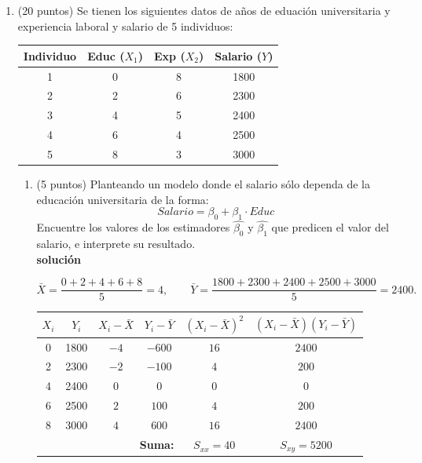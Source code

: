 \documentclass[10pt,a4paper]{article}
\begin{document}
\begin{enumerate}


\item (20 puntos) Se tienen los siguientes datos de años de eduación universitaria y experiencia laboral y salario de 5 individuos:
\begin{center}
\begin{tabular}{|c|c|c|c|}
\hline
\textbf{Individuo} & \textbf{Educ} ($X_1$) & \textbf{Exp} ($X_2$)  & \textbf{Salario ($Y$)}\\
\hline
1 & 0 &  8 & 1800 \\
2 & 2 &  6 & 2300 \\
3 & 4 &  5 & 2400 \\
4 & 6 &  4 & 2500 \\
5 & 8 &  3 & 3000 \\
\hline
\end{tabular}
\end{center}

\begin{enumerate}
    \item (5 puntos) Planteando un modelo donde el salario sólo dependa de la educación universitaria de la forma:
    $$Salario = \beta_0 + \beta_1 \cdot Educ$$
    Encuentre los valores de los estimadores $\hat{\beta_0}$ y $\hat{\beta_1}$ que predicen el valor del salario, e interprete su resultado.
    \\
    \textbf{solución}

\[
\bar X=\frac{0+2+4+6+8}{5}=4, 
\qquad
\bar Y=\frac{1800+2300+2400+2500+3000}{5}=2400.
\]


\begin{center}
\begin{tabular}{|c|c|c|c|c|c|}
\toprule
\hline
$X_i$ & $Y_i$ & $X_i-\bar X$ & $Y_i-\bar Y$ & $(X_i-\bar X)^2$ & $(X_i-\bar X)(Y_i-\bar Y)$ \\
\hline
\midrule
0 & 1800 & $-4$ & $-600$ & $16$ & $2400$ \\
2 & 2300 & $-2$ & $-100$ & $4$ & $200$ \\
4 & 2400 & $0$  & $0$    & $0$ & $0$ \\
6 & 2500 & $2$  & $100$  & $4$ & $200$ \\
8 & 3000 & $4$  & $600$  & $16$ & $2400$ \\
\midrule
\hline
\multicolumn{4}{r}{\textbf{Suma:}} & $\displaystyle S_{xx}=40$ & $\displaystyle S_{xy}=5200$ \\

\bottomrule
\end{tabular}
\end{center}


\end{enumerate}
\end{enumerate}
\end{document}
